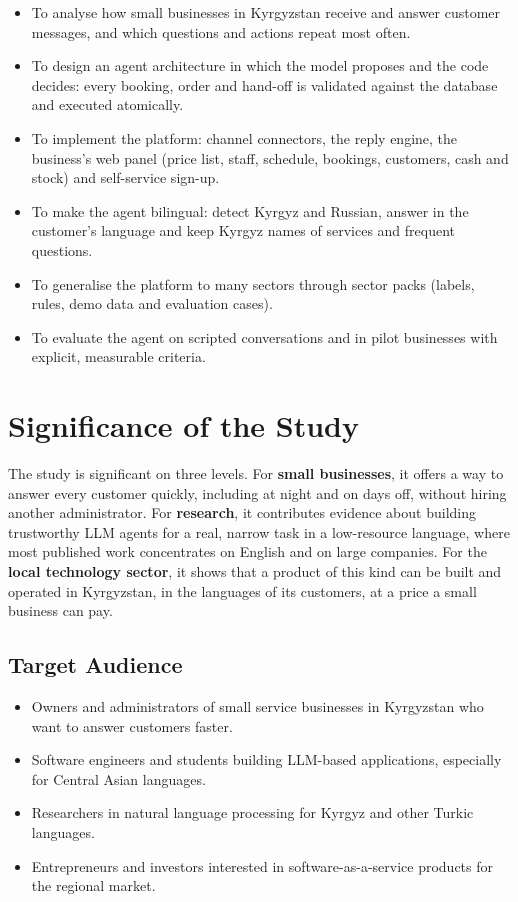 \begin{itemize}
	\item To analyse how small businesses in Kyrgyzstan receive and answer customer messages, and which questions and
	actions repeat most often.
	\item To design an agent architecture in which the model proposes and the code decides: every booking, order and
	hand-off is validated against the database and executed atomically.
	\item To implement the platform: channel connectors, the reply engine, the business's web panel (price list, staff,
	schedule, bookings, customers, cash and stock) and self-service sign-up.
	\item To make the agent bilingual: detect Kyrgyz and Russian, answer in the customer's language and keep Kyrgyz names
	of services and frequent questions.
	\item To generalise the platform to many sectors through sector packs (labels, rules, demo data and evaluation cases).
	\item To evaluate the agent on scripted conversations and in pilot businesses with explicit, measurable criteria.
\end{itemize}


\section{Significance of the Study}

The study is significant on three levels. For \textbf{small businesses}, it offers a way to answer every customer
quickly, including at night and on days off, without hiring another administrator. For \textbf{research}, it
contributes evidence about building trustworthy LLM agents for a real, narrow task in a low-resource language, where
most published work concentrates on English and on large companies. For the \textbf{local technology sector}, it shows
that a product of this kind can be built and operated in Kyrgyzstan, in the languages of its customers, at a price a
small business can pay.

\subsection{Target Audience}

\begin{itemize}
	\item Owners and administrators of small service businesses in Kyrgyzstan who want to answer customers faster.
	\item Software engineers and students building LLM-based applications, especially for Central Asian languages.
	\item Researchers in natural language processing for Kyrgyz and other Turkic languages.
	\item Entrepreneurs and investors interested in software-as-a-service products for the regional market.
\end{itemize}

